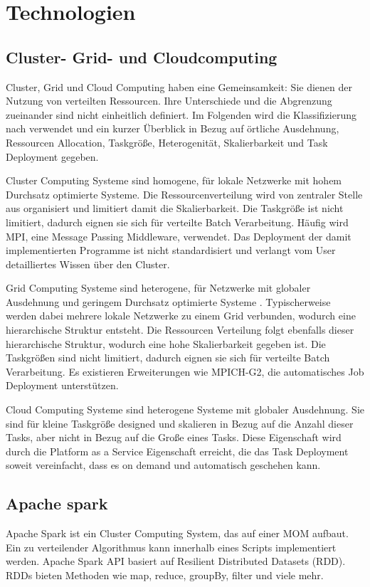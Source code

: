 \section{Technologien}

\subsection{Cluster- Grid- und Cloudcomputing}
Cluster, Grid und Cloud Computing haben eine Gemeinsamkeit:
Sie dienen der Nutzung von verteilten Ressourcen.
Ihre Unterschiede und die Abgrenzung zueinander sind nicht einheitlich definiert.
Im Folgenden wird die Klassifizierung nach \cite{sadashiv2011cluster} verwendet und ein kurzer Überblick in Bezug auf örtliche Ausdehnung, Ressourcen Allocation, Taskgröße, Heterogenität, Skalierbarkeit und Task Deployment gegeben.

Cluster Computing Systeme sind homogene, für lokale Netzwerke mit hohem Durchsatz optimierte Systeme.
Die Ressourcenverteilung wird von zentraler Stelle aus organisiert und limitiert damit die Skalierbarkeit.
Die Taskgröße ist nicht limitiert, dadurch eignen sie sich für verteilte Batch Verarbeitung.
Häufig wird MPI, eine Message Passing Middleware, verwendet.
Das Deployment der damit implementierten Programme ist nicht standardisiert und verlangt vom User detailliertes Wissen über den Cluster.

Grid Computing Systeme sind heterogene, für Netzwerke mit globaler Ausdehnung und geringem Durchsatz optimierte Systeme \cite{foster2003grid, foster2006grid}.
Typischerweise werden dabei mehrere lokale Netzwerke zu einem Grid verbunden, wodurch eine hierarchische Struktur entsteht.
Die Ressourcen Verteilung folgt ebenfalls dieser hierarchische Struktur, wodurch eine hohe Skalierbarkeit gegeben ist.
Die Taskgrößen sind nicht limitiert, dadurch eignen sie sich für verteilte Batch Verarbeitung.
Es existieren Erweiterungen wie MPICH-G2, die automatisches Job Deployment unterstützen.

Cloud Computing Systeme sind heterogene Systeme mit globaler Ausdehnung.
Sie sind für kleine Taskgröße designed und skalieren in Bezug auf die Anzahl dieser Tasks, aber nicht in Bezug auf die Große eines Tasks.
Diese Eigenschaft wird durch die Platform as a Service Eigenschaft erreicht, die das Task Deployment soweit vereinfacht, dass es on demand und automatisch geschehen kann.





\subsection{Apache spark}
Apache Spark ist ein Cluster Computing System, das auf einer MOM aufbaut.
Ein zu verteilender Algorithmus kann innerhalb eines Scripts implementiert werden.
Apache Spark API basiert auf Resilient Distributed Datasets (RDD).
RDDs bieten Methoden wie map, reduce, groupBy, filter und viele mehr.

